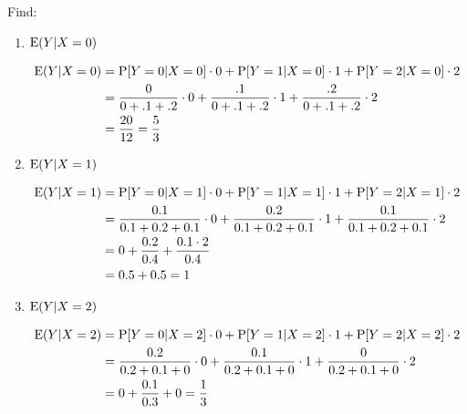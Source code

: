 Find:
\begin{enumerate}[label=(\alph*)]
\item $\text{E}(Y|X=0)$
\begin{solution}[3cm]
\begin{equation}
\begin{split}
\text{E}(Y|X=0) &= \text{P}[Y=0|X=0] \cdot 0 + \text{P}[Y=1|X=0] \cdot 1 + \text{P}[Y=2|X=0] 
\cdot 2 \\ \nonumber
	    &= \frac{0}{0+.1+.2} \cdot 0 + \frac{.1}{0+.1+.2} \cdot 1 + 
	    \frac{.2}{0+.1+.2} \cdot 2 \\
	    &= \frac{20}{12} = \frac{5}{3}
\end{split}
\end{equation}
\end{solution}

\item $\text{E}(Y|X=1)$
\begin{solution}[3cm]
\begin{equation}
\begin{split}
\text{E}(Y|X=1) &= \text{P}[Y=0|X=1] \cdot 0 + \text{P}[Y=1|X=1] \cdot 1 + \text{P}[Y=2|X=1] 
\cdot 2 \\ \nonumber
	    &= \frac{0.1}{0.1 + 0.2 + 0.1}  \cdot 0 +  \frac{0.2}{0.1 + 0.2 + 0.1} 
	    \cdot 1 +  \frac{0.1}{0.1 + 0.2 + 0.1} \cdot 2 \\
	    &= 0 + \frac{0.2}{0.4} + \frac{0.1 \cdot 2}{0.4} \\
	    &= 0.5 + 0.5 = 1
\end{split}
\end{equation}
\end{solution}


\item $\text{E}(Y|X=2)$
\begin{solution}[3cm]
\begin{equation}
\begin{split}
\text{E}(Y|X=2) &= \text{P}[Y=0|X=2] \cdot 0 + \text{P}[Y=1|X=2] \cdot 1 + \text{P}[Y=2|X=2] 
\cdot 2 \\ \nonumber
	    &= \frac{0.2}{0.2 + 0.1 + 0}  \cdot 0 + \frac{0.1}{0.2 + 0.1 + 0}  
	    \cdot 1 + \frac{0}{0.2 + 0.1 + 0}  \cdot 2 \\
	    &= 0 + \frac{0.1}{0.3} + 0 = \frac{1}{3}
\end{split}
\end{equation}
\end{solution}


\end{enumerate}
